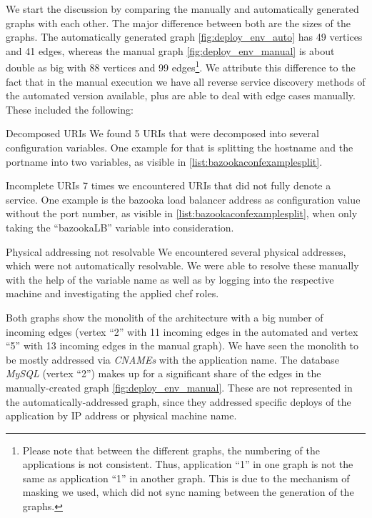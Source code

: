 We start the discussion by comparing the manually and automatically generated graphs with each other. The major difference between both are the sizes of the graphs. The automatically generated graph \ref{fig:deploy_env_auto} has 49 vertices and 41 edges, whereas the manual graph \ref{fig:deploy_env_manual} is about double as big with 88 vertices and 99 edges\footnote{Please note that between the different graphs, the numbering of the applications is not consistent. Thus, application ``1'' in one graph is not the same as application ``1'' in another graph. This is due to the mechanism of masking we used, which did not sync naming between the generation of the graphs.}. We attribute this difference to the fact that in the manual execution we have all reverse service discovery methods of the automated version available, plus are able to deal with edge cases manually. These included the following:
\begin{tdescription}
  \item[Decomposed URIs] We found 5 URIs that were decomposed into several configuration variables. One example for that is splitting the hostname and the portname into two variables, as visible in \autoref{list:bazookaconfexamplesplit}.
  \item[Incomplete URIs] 7 times we encountered URIs that did not fully denote a service. One example is the bazooka load balancer address as configuration value without the port number, as visible in \autoref{list:bazookaconfexamplesplit}, when only taking the ``bazookaLB'' variable into consideration.
  \item[Physical addressing not resolvable] We encountered several physical addresses, which were not automatically resolvable. We were able to resolve these manually with the help of the variable name as well as by logging into the respective machine and investigating the applied chef roles.
\end{tdescription}

Both graphs show the monolith of the architecture with a big number of incoming edges (vertex ``2'' with 11 incoming edges in the automated and vertex ``5'' with 13 incoming edges in the manual graph). We have seen the monolith to be mostly addressed via \emph{CNAMEs} with the application name. The database \emph{MySQL} (vertex ``2'') makes up for a significant share of the edges in the manually-created graph \autoref{fig:deploy_env_manual}. These are not represented in the automatically-addressed graph, since they addressed specific deploys of the application by IP address or physical machine name.

